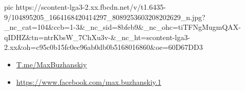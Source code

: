 \ifcmt
  pic https://scontent-lga3-2.xx.fbcdn.net/v/t1.6435-9/104895205_1664168420414297_8089253603208202629_n.jpg?_nc_cat=104&ccb=1-3&_nc_sid=8bfeb9&_nc_ohc=tiTFNgMugmQAX-qIDHZ&tn=ntrKbsW_7ChXu3v-&_nc_ht=scontent-lga3-2.xx&oh=c95c0b15fc0ec96ab0db0b5168016860&oe=60D67DD3
\fi

\begin{itemize}
  \item \url{T.me/MaxBuzhanskiy}
  \item \url{https://www.facebook.com/max.buzhanskiy.1}
\end{itemize}
